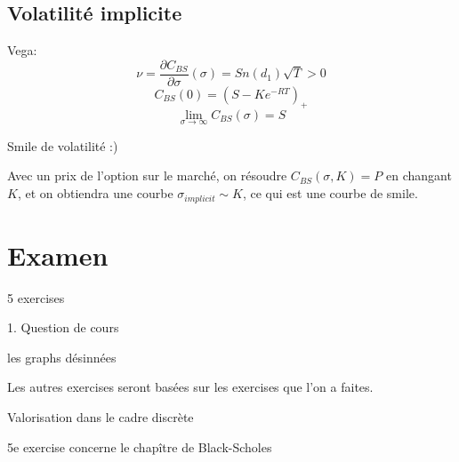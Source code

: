 \documentclass{article}
\theoremstyle{plain}
\theoremstyle{definition}
\begin{document}
\subsection{Volatilit\'e implicite}
Vega:
\begin{equation}
\nu=\frac{\partial C_{BS}}{\partial \sigma}(\sigma)=Sn(d_1)\sqrt{T}>0
\end{equation}
\begin{equation}
C_{BS}(0)=(S-Ke^{-RT})_+
\end{equation}
\begin{equation}
\lim_{\sigma\to\infty}C_{BS}(\sigma)=S
\end{equation}

Smile de volatilit\'e :)

Avec un prix de l'option sur le march\'e, on r\'esoudre $C_{BS}(\sigma,K)=P$ en changant $K$, et on obtiendra une courbe $\sigma_{implicit}\sim K$, ce qui est une courbe de smile.

\section{Examen}
5 exercises

1. Question de cours

les graphs d\'esinn\'ees

Les autres exercises seront bas\'ees sur les exercises que l'on a faites.

Valorisation dans le cadre discr\`ete

5e exercise concerne le chap\^itre de Black-Scholes
\end{document}
